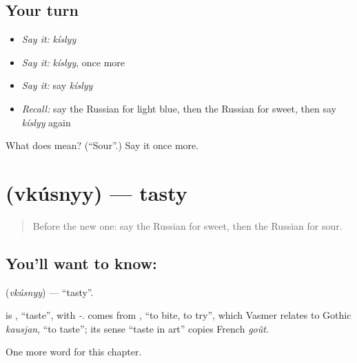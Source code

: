 \subsection*{Your turn}
\begin{itemize}
\raggedright
  \item \emph{Say it:} \emph{kíslyy}
  \item \emph{Say it:} \emph{kíslyy}, once more
  \item \emph{Say it:} say \emph{kíslyy}
  \item \emph{Recall:} say the Russian for light blue, then the Russian for sweet, then say \emph{kíslyy} again
\end{itemize}

\begin{tcolorbox}[breakable,colback=teal!4,colframe=teal!35!black,title={Before you move on}]
What does  mean? (\textquotedblleft{}Sour\textquotedblright{}.) Say it once more.
\end{tcolorbox}
\section[\texorpdfstring{\ru{вкусный} (vkúsnyy)}{вкусный (vkúsnyy)}]{ (vkúsnyy) — tasty}

\label{lesson:RU-C157-vkusnyy}



\begin{quote}
Before the new one: say the Russian for sweet, then the Russian for sour.
\end{quote}

\subsection*{You'll want to know: }
\textbf{} (\emph{vkúsnyy}) — \textquotedblleft{}tasty\textquotedblright{}.

\begin{cousinweb}
\textbf{} is \emph{}, \textquotedblleft{}taste\textquotedblright{}, with \emph{-}. \emph{} comes from \emph{}, \textquotedblleft{}to bite, to try\textquotedblright{}, which Vasmer relates to Gothic \emph{kausjan}, \textquotedblleft{}to taste\textquotedblright{}; its sense \textquotedblleft{}taste in art\textquotedblright{} copies French \emph{goût}.
\end{cousinweb}

\begin{grammarlens}[title={What you've built}]
One more word for this chapter.
\end{grammarlens}

